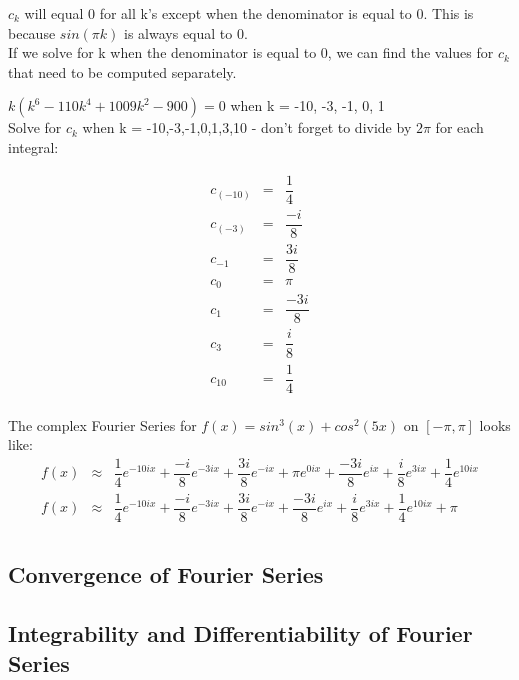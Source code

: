 \documentclass{article}
\newcommand{\bea}{\begin{eqnarray*}}
\newcommand{\eea}{\end{eqnarray*}}
\newcommand{\red}[1]{\textcolor{red}{#1}}
\newcommand{\blue}[1]{\textcolor{blue}{#1}}
\begin{document}
$c_k$ will equal 0 for all k's except when the denominator is equal to 0. This is because $sin(\pi k)$ is always equal to 0.\\

If we solve for k when the denominator is equal to 0, we can find the values for $c_k$ that need to be computed separately. \newline

$k(k^6-110k^4+1009k^2-900)=0$ when k = -10, -3, -1, 0, 1 \\

Solve for $c_k$ when k = -10,-3,-1,0,1,3,10 - don't forget to divide by $2\pi$ for each integral:\newline

\bea
c_{(-10)} &=& \dfrac{1}{4} \\
c_{(-3)} &=& \dfrac{-i}{8} \\
c_{-1} &=& \dfrac{3i}{8} \\
c_0 &=& \pi \\
c_1 &=& \dfrac{-3i}{8}\\
c_3 &=& \dfrac{i}{8}\\
c_{10} &=& \dfrac{1}{4}\\
\eea

The complex Fourier Series for $f(x) = sin^3(x)+cos^2(5x)$ on $[-\pi,\pi]$ looks like:
\bea
f(x) &\approx& \dfrac{1}{4}e^{-10ix} + \dfrac{-i}{8}e^{-3ix} + \dfrac{3i}{8}e^{-ix} + \pi e^{0ix} + \dfrac{-3i}{8}e^{ix} +\dfrac{i}{8}e^{3ix} +\dfrac{1}{4}e^{10ix}\\
f(x) &\approx& \dfrac{1}{4}e^{-10ix} + \dfrac{-i}{8}e^{-3ix} + \dfrac{3i}{8}e^{-ix} + \dfrac{-3i}{8}e^{ix} +\dfrac{i}{8}e^{3ix} +\dfrac{1}{4}e^{10ix} + \pi\\
\eea



\subsection{Convergence of Fourier Series}

\subsection{Integrability and Differentiability of Fourier Series}
\end{document}
